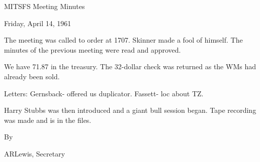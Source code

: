 \documentclass[12pt]{article}
\begin{document}
\begin{center}

MITSFS Meeting Minutes

Friday, April 14, 1961

\end{center}
 
\vspace{12pt}

\setlength{\parskip}{6pt}

\noindent
The meeting was called to order at 1707. Skinner made a fool of himself. The minutes of the previous meeting were read and approved.

We have 71.87 in the treasury. The 32-dollar check was returned as the WMs had already been sold.

Letters: Gernsback- offered us duplicator. Fassett- loc about TZ.

Harry Stubbs was then introduced and a giant bull session began. Tape recording was made and is in the files.

\vspace{12pt}

\centerline{By}
\centerline{ARLewis, Secretary}
\end{document}
